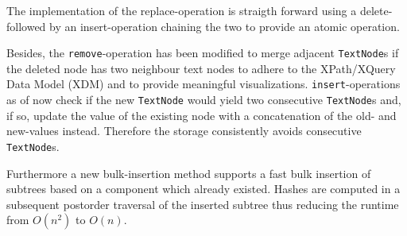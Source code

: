 


The implementation of the replace-operation is straigth forward using a delete- followed by an insert-operation chaining the two to provide an atomic operation.

Besides, the \texttt{remove}-operation has been modified to merge adjacent \texttt{TextNode}s if the deleted node has two neighbour text nodes to adhere to the XPath/XQuery Data Model (XDM) and to provide meaningful visualizations. \texttt{insert}-operations as of now check if the new \texttt{TextNode} would yield two consecutive \texttt{TextNode}s and, if so, update the value of the existing node with a concatenation of the old- and new-values instead. Therefore the storage consistently avoids consecutive \texttt{TextNode}s. 

Furthermore a new bulk-insertion method supports a fast bulk insertion of subtrees based on a component which already existed. Hashes are computed in a subsequent postorder traversal of the inserted subtree thus reducing the runtime from $O(n^2)$ to $O(n)$.


